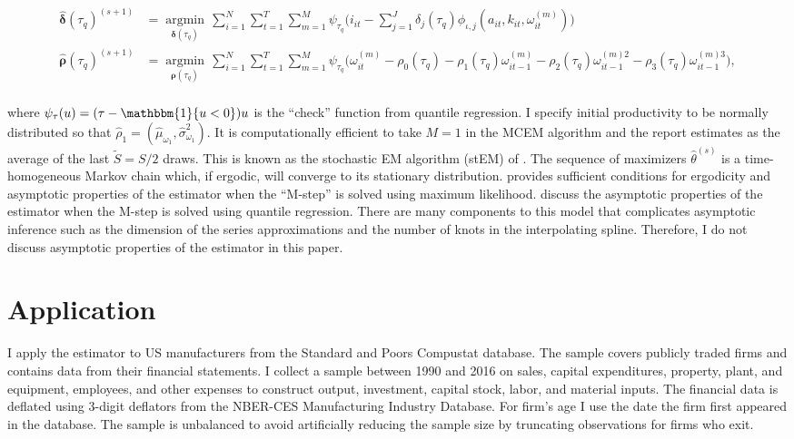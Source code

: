\documentclass{article}
\begin{document}
\begin{enumerate}
\begin{equation*}
\begin{split}
    \hat{\boldsymbol\delta}(\tau_{q})^{(s+1)}&=\underset{\boldsymbol\delta(\tau_{q})}{\operatorname{argmin}}\,\sum_{i=1}^{N}\sum_{t=1}^{T}\sum_{m=1}^{M}\psi_{\tau_{q}}\bigg(i_{it}-\sum_{j=1}^{J}\delta_{j}(\tau_{q})\phi_{\iota,j}(a_{it}, k_{it}, \omega^{(m)}_{it})\bigg)\\%
    \hat{\boldsymbol\rho}(\tau_{q})^{(s+1)}&=\underset{\boldsymbol\rho(\tau_{q})}{\operatorname{argmin}}\,\sum_{i=1}^{N}\sum_{t=1}^{T}\sum_{m=1}^{M}\psi_{\tau_{q}}\bigg(\omega^{(m)}_{it}-\rho_{0}(\tau_{q})-\rho_{1}(\tau_{q})\omega^{(m)}_{it-1}-\rho_{2}(\tau_{q})\omega^{(m)2}_{it-1}-\rho_{3}(\tau_{q})\omega^{(m)3}_{it-1}\bigg),\\
    \end{split}
    \end{equation*}
\end{enumerate}
where $\psi_{\tau}(u)=(\tau-\mathbbm{1}\{u<0\})u$ is the ``check'' function from quantile regression. I specify initial productivity to be normally distributed so that $\hat{\rho}_{1}=(\hat{\mu}_{\omega_{1}}, \hat{\sigma}_{\omega_{1}}^{2})$. It is computationally efficient to take $M=1$ in the MCEM algorithm and the report estimates as the average of the last $\tilde{S}=S/2$ draws. This is known as the stochastic EM algorithm (stEM) of \cite{sem}. The sequence of maximizers $\hat{\theta}^{(s)}$ is a time-homogeneous Markov chain which, if ergodic, will converge to its stationary distribution. \cite{Nielsen2000} provides sufficient conditions for ergodicity and asymptotic properties of the estimator when the ``M-step'' is solved using maximum likelihood. \cite{Arellano2016} discuss the asymptotic properties of the estimator when the M-step is solved using quantile regression. There are many components to this model that complicates asymptotic inference such as the dimension of the series approximations and the number of knots in the interpolating spline. Therefore, I do not discuss asymptotic properties of the estimator in this paper.

\section{Application} \label{application}
I apply the estimator to US manufacturers from the Standard and Poors Compustat database. The sample covers publicly traded firms and contains data from their financial statements. I collect a sample between 1990 and 2016 on sales, capital expenditures, property, plant, and equipment, employees, and other expenses to construct output, investment, capital stock, labor, and material inputs. The financial data is deflated using 3-digit deflators from the NBER-CES Manufacturing Industry Database. For firm's age I use the date the firm first appeared in the database. The sample is unbalanced to avoid artificially reducing the sample size by truncating observations for firms who exit.
\end{document}
